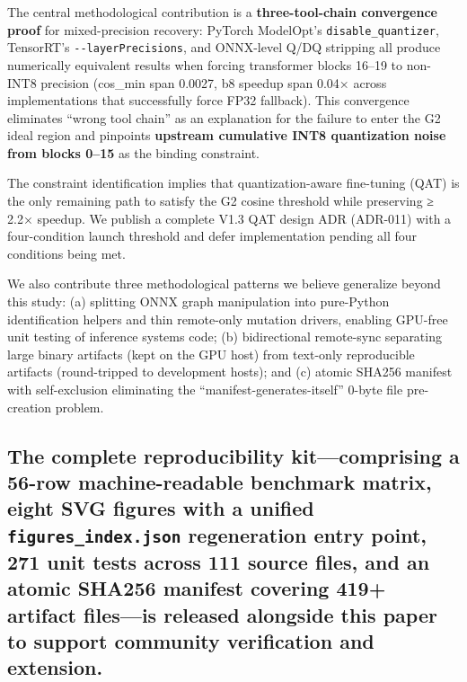 \documentclass[
]{article}
\begin{document}
The central methodological contribution is a \textbf{three-tool-chain
convergence proof} for mixed-precision recovery: PyTorch ModelOpt's
\texttt{disable\_quantizer}, TensorRT's \texttt{-\/-layerPrecisions},
and ONNX-level Q/DQ stripping all produce numerically equivalent results
when forcing transformer blocks 16--19 to non-INT8 precision (cos\_min
span 0.0027, b8 speedup span 0.04× across implementations that
successfully force FP32 fallback). This convergence eliminates ``wrong
tool chain'' as an explanation for the failure to enter the G2 ideal
region and pinpoints \textbf{upstream cumulative INT8 quantization noise
from blocks 0--15} as the binding constraint.

The constraint identification implies that quantization-aware
fine-tuning (QAT) is the only remaining path to satisfy the G2 cosine
threshold while preserving ≥ 2.2× speedup. We publish a complete V1.3
QAT design ADR (ADR-011) with a four-condition launch threshold and
defer implementation pending all four conditions being met.

We also contribute three methodological patterns we believe generalize
beyond this study: (a) splitting ONNX graph manipulation into
pure-Python identification helpers and thin remote-only mutation
drivers, enabling GPU-free unit testing of inference systems code; (b)
bidirectional remote-sync separating large binary artifacts (kept on the
GPU host) from text-only reproducible artifacts (round-tripped to
development hosts); and (c) atomic SHA256 manifest with self-exclusion
eliminating the ``manifest-generates-itself'' 0-byte file pre-creation
problem.

\subsection{\texorpdfstring{The complete reproducibility
kit---comprising a 56-row machine-readable benchmark matrix, eight SVG
figures with a unified \texttt{figures\_index.json} regeneration entry
point, 271 unit tests across 111 source files, and an atomic SHA256
manifest covering 419+ artifact files---is released alongside this paper
to support community verification and
extension.}{The complete reproducibility kit---comprising a 56-row machine-readable benchmark matrix, eight SVG figures with a unified figures\_index.json regeneration entry point, 271 unit tests across 111 source files, and an atomic SHA256 manifest covering 419+ artifact files---is released alongside this paper to support community verification and extension.}}\label{the-complete-reproducibility-kitcomprising-a-56-row-machine-readable-benchmark-matrix-eight-svg-figures-with-a-unified-figures_index.json-regeneration-entry-point-271-unit-tests-across-111-source-files-and-an-atomic-sha256-manifest-covering-419-artifact-filesis-released-alongside-this-paper-to-support-community-verification-and-extension.}
\end{document}
